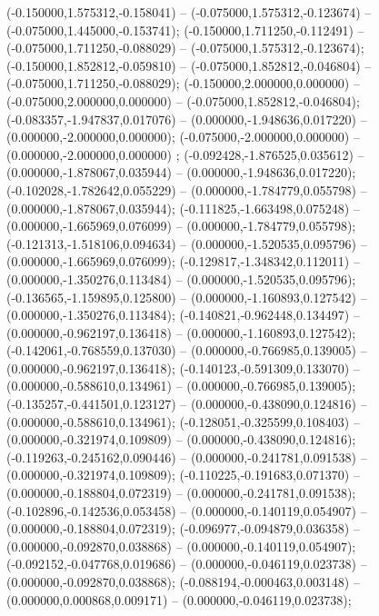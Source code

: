  (-0.150000,1.575312,-0.158041) -- (-0.075000,1.575312,-0.123674) -- (-0.075000,1.445000,-0.153741);
 (-0.150000,1.711250,-0.112491) -- (-0.075000,1.711250,-0.088029) -- (-0.075000,1.575312,-0.123674);
 (-0.150000,1.852812,-0.059810) -- (-0.075000,1.852812,-0.046804) -- (-0.075000,1.711250,-0.088029);
 (-0.150000,2.000000,0.000000) -- (-0.075000,2.000000,0.000000) -- (-0.075000,1.852812,-0.046804);
 (-0.083357,-1.947837,0.017076) -- (0.000000,-1.948636,0.017220) -- (0.000000,-2.000000,0.000000);
 (-0.075000,-2.000000,0.000000) -- (0.000000,-2.000000,0.000000) ;
 (-0.092428,-1.876525,0.035612) -- (0.000000,-1.878067,0.035944) -- (0.000000,-1.948636,0.017220);
 (-0.102028,-1.782642,0.055229) -- (0.000000,-1.784779,0.055798) -- (0.000000,-1.878067,0.035944);
 (-0.111825,-1.663498,0.075248) -- (0.000000,-1.665969,0.076099) -- (0.000000,-1.784779,0.055798);
 (-0.121313,-1.518106,0.094634) -- (0.000000,-1.520535,0.095796) -- (0.000000,-1.665969,0.076099);
 (-0.129817,-1.348342,0.112011) -- (0.000000,-1.350276,0.113484) -- (0.000000,-1.520535,0.095796);
 (-0.136565,-1.159895,0.125800) -- (0.000000,-1.160893,0.127542) -- (0.000000,-1.350276,0.113484);
 (-0.140821,-0.962448,0.134497) -- (0.000000,-0.962197,0.136418) -- (0.000000,-1.160893,0.127542);
 (-0.142061,-0.768559,0.137030) -- (0.000000,-0.766985,0.139005) -- (0.000000,-0.962197,0.136418);
 (-0.140123,-0.591309,0.133070) -- (0.000000,-0.588610,0.134961) -- (0.000000,-0.766985,0.139005);
 (-0.135257,-0.441501,0.123127) -- (0.000000,-0.438090,0.124816) -- (0.000000,-0.588610,0.134961);
 (-0.128051,-0.325599,0.108403) -- (0.000000,-0.321974,0.109809) -- (0.000000,-0.438090,0.124816);
 (-0.119263,-0.245162,0.090446) -- (0.000000,-0.241781,0.091538) -- (0.000000,-0.321974,0.109809);
 (-0.110225,-0.191683,0.071370) -- (0.000000,-0.188804,0.072319) -- (0.000000,-0.241781,0.091538);
 (-0.102896,-0.142536,0.053458) -- (0.000000,-0.140119,0.054907) -- (0.000000,-0.188804,0.072319);
 (-0.096977,-0.094879,0.036358) -- (0.000000,-0.092870,0.038868) -- (0.000000,-0.140119,0.054907);
 (-0.092152,-0.047768,0.019686) -- (0.000000,-0.046119,0.023738) -- (0.000000,-0.092870,0.038868);
 (-0.088194,-0.000463,0.003148) -- (0.000000,0.000868,0.009171) -- (0.000000,-0.046119,0.023738);
